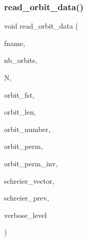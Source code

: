 \subsubsection{\texorpdfstring{read\+\_\+orbit\+\_\+data()}{read\_orbit\_data()}}
{\footnotesize\ttfamily void read\+\_\+orbit\+\_\+data (\begin{DoxyParamCaption}\item[{const \mbox{\hyperlink{galois_8h_ab6cc7b4aeb6ea31aba2b3fbfc83ff5e6}{B\+Y\+TE}} $\ast$}]{fname,  }\item[{\mbox{\hyperlink{galois_8h_a09fddde158a3a20bd2dcadb609de11dc}{I\+NT}} \&}]{nb\+\_\+orbits,  }\item[{\mbox{\hyperlink{galois_8h_a09fddde158a3a20bd2dcadb609de11dc}{I\+NT}} \&}]{N,  }\item[{\mbox{\hyperlink{galois_8h_a09fddde158a3a20bd2dcadb609de11dc}{I\+NT}} $\ast$\&}]{orbit\+\_\+fst,  }\item[{\mbox{\hyperlink{galois_8h_a09fddde158a3a20bd2dcadb609de11dc}{I\+NT}} $\ast$\&}]{orbit\+\_\+len,  }\item[{\mbox{\hyperlink{galois_8h_a09fddde158a3a20bd2dcadb609de11dc}{I\+NT}} $\ast$\&}]{orbit\+\_\+number,  }\item[{\mbox{\hyperlink{galois_8h_a09fddde158a3a20bd2dcadb609de11dc}{I\+NT}} $\ast$\&}]{orbit\+\_\+perm,  }\item[{\mbox{\hyperlink{galois_8h_a09fddde158a3a20bd2dcadb609de11dc}{I\+NT}} $\ast$\&}]{orbit\+\_\+perm\+\_\+inv,  }\item[{\mbox{\hyperlink{galois_8h_a09fddde158a3a20bd2dcadb609de11dc}{I\+NT}} $\ast$\&}]{schreier\+\_\+vector,  }\item[{\mbox{\hyperlink{galois_8h_a09fddde158a3a20bd2dcadb609de11dc}{I\+NT}} $\ast$\&}]{schreier\+\_\+prev,  }\item[{\mbox{\hyperlink{galois_8h_a09fddde158a3a20bd2dcadb609de11dc}{I\+NT}}}]{verbose\+\_\+level }\end{DoxyParamCaption})}

\mbox{\label{plot__decomposition__matrix_8_c_a8d46d2e552765fe157db5a0247442503}} 
